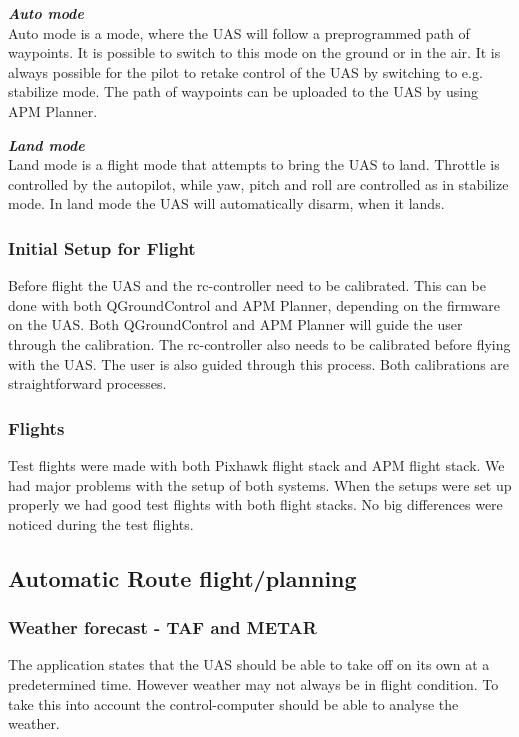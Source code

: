 \emph{\textbf{Auto mode}}\\
Auto mode is a mode, where the UAS will follow a preprogrammed path of waypoints. It is possible to switch to this mode on the ground or in the air. It is always possible for the pilot to retake control of the UAS by switching to e.g. stabilize mode. The path of waypoints can be uploaded to the UAS by using APM Planner.

\emph{\textbf{Land mode}}\\
Land mode is a flight mode that attempts to bring the UAS to land. Throttle is controlled by the autopilot, while yaw, pitch and roll are controlled as in stabilize mode. In land mode the UAS will automatically disarm, when it lands.

\subsubsection{Initial Setup for Flight}
Before flight the UAS and the rc-controller need to be calibrated. This can be done with both QGroundControl and APM Planner, depending on the firmware on the UAS.
Both QGroundControl and APM Planner will guide the user through the calibration.
The rc-controller also needs to be calibrated before flying with the UAS. The user is also guided through this process. Both calibrations are straightforward processes.

\subsubsection{Flights}
Test flights were made with both Pixhawk flight stack and APM flight stack. We had major problems with the setup of both systems. 
When the setups were set up properly we had good test flights with both flight stacks. No big differences were noticed during the test flights.

\subsection{Automatic Route flight/planning}
\subsubsection{Weather forecast - TAF and METAR}
The application states that the UAS should be able to take off on its own at a predetermined time. However weather may not always be in flight condition. To take this into account the control-computer should be able to analyse the weather.

